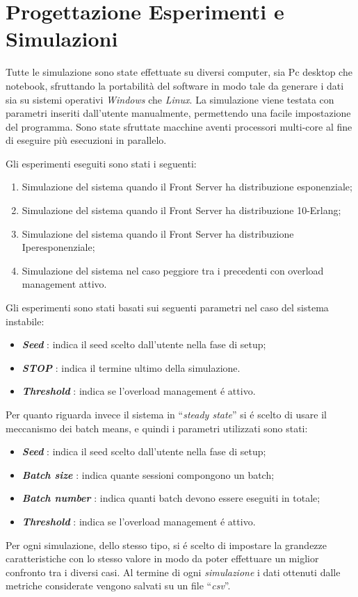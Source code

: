 \chapter{Progettazione Esperimenti e Simulazioni} 

Tutte le simulazione sono state effettuate su diversi computer, sia Pc desktop 
che notebook, sfruttando la portabilit\`a del software in modo tale da generare 
i dati sia su sistemi operativi \textit{Windows} che \textit{Linux}. La 
simulazione viene testata con parametri inseriti dall'utente manualmente, 
permettendo una facile impostazione del programma.
Sono state sfruttate macchine aventi processori multi-core al fine di eseguire 
pi\`u esecuzioni in parallelo.

\noindent Gli esperimenti eseguiti sono stati i seguenti:

\begin{enumerate}
 \item Simulazione del sistema quando il Front Server ha distribuzione 
esponenziale;
 \item Simulazione del sistema quando il Front Server ha distribuzione 
10-Erlang;
 \item Simulazione del sistema quando il Front Server ha distribuzione 
Iperesponenziale;
 \item Simulazione del sistema nel caso peggiore tra i precedenti con overload management attivo.
\end{enumerate}

 \vspace{0.5cm}Gli esperimenti sono stati basati sui seguenti parametri nel caso del sistema instabile:
\begin{itemize}
 \item \textbf{\textit{Seed}} : indica il seed scelto dall'utente nella fase di setup;
 \item \textbf{\textit{STOP}} : indica il termine ultimo della simulazione.
 \item \textbf{\textit{Threshold}} : indica se l'overload management \'e attivo.
\end{itemize}

\noindent \vspace{0.5cm} Per quanto riguarda invece il sistema in ``\textit{steady state}'' si \'e scelto di usare il meccanismo dei batch means, e quindi i parametri utilizzati sono stati:
\begin{itemize}
 \item \textbf{\textit{Seed}} : indica il seed scelto dall'utente nella fase di setup;
 \item \textbf{\textit{Batch size}} : indica quante sessioni compongono un batch;
 \item \textbf{\textit{Batch number}} : indica quanti batch devono essere eseguiti in totale;
 \item \textbf{\textit{Threshold}} : indica se l'overload management \'e attivo.
\end{itemize}

Per ogni simulazione, dello stesso tipo, si \'e scelto di impostare la grandezze caratteristiche
con lo stesso valore in modo da poter effettuare un miglior confronto tra i diversi casi. Al termine
di ogni \textit{simulazione} i dati ottenuti dalle metriche considerate vengono salvati su un file ``\textit{csv}''.